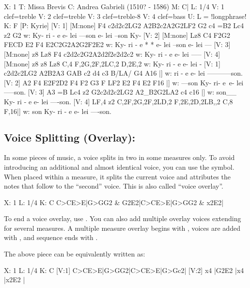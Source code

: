 \documentclass[a4paper,12pt]{book}
\begin{document}
{\small
\begin{abcsource}
X: 1
T: Missa Brevis
C: Andrea Gabrieli (1510? - 1586)
M: C|
L: 1/4
V: 1 clef=treble
V: 2 clef=treble
V: 3 clef=treble-8
V: 4 clef=bass
U: L = !longphrase!
K: F
%
[P: Kyrie]
[V: 1] [M:none] F4 c2d2c2LG2 A2B2c2A2G2LF2 G2 c4 =B2 Lc4 z2 G2
w: Ky- ri - e e- lei ---son e- lei --son Ky-
[V: 2] [M:none] Lz8 C4 F2G2 FECD E2 F4 E2C2G2A2G2F2E2
w: Ky- ri - e * * e- lei --son e- lei ---
[V: 3] [M:none] z8 Lz8 F4 c2d2c2G2A2d2f2e2d2c2
w: Ky- ri - e e- lei -----
[V: 4] [M:none] z8 z8 Lz8 C,4 F,2G,2F,2LC,2 D,2E,2
w: Ky- ri - e e- lei -
%
[V: 1] c2d2c2LG2 A2B2A3 GAB c2 d4 c3 B/LA/ G4 A16      |]
w: ri - e e- lei -----------son.
[V: 2] A2 F4 E2F2D2 F4 F2 G3 F LF2 E2 F4 E2 F16        |]
w: ---son Ky- ri- e~e- lei -----son.
[V: 3] A3 =B Lc4 z2 G2c2d2c2LG2 A2_B2G2LA2 c4 c16      |]
w: son__ Ky- ri - e e- lei ----son.
[V: 4] LF,4 z2 C,2F,2G,2F,2LD,2 F,2E,2D,2LB,,2 C,8 F,16|]
w: son Ky- ri - e e- lei ----son.
\end{abcsource}
}



\subsection{Voice Splitting (Overlay): \icmd{\&}}

In some pieces of music, a voice splits in two in some measures only.
To avoid introducing an additional and almost identical voice, you can
use the \car{\&} symbol. When placed within a measure, it splits the
current voice and attributes the notes that follow to the ``second''
voice. This is also called ``voice overlay''.

\begin{abcsource}
X: 1
L: 1/4
K: C
C>CE>E|G>GG2 & G2E2|C>CE>E|G>GG2 & x2E2|
\end{abcsource}


To end a voice overlay, use \cmd{\&)}. You can also add multiple
overlay voices extending for several measures. A multiple measure
overlay begins with \cmd{(\&)}, voices are added with \car{\&},
and sequence ends with \cmd{\&}.

The above piece can be equivalently written as:

\begin{abcsource}
X: 1
L: 1/4
K: C
[V:1] C>CE>E|G>GG2|C>CE>E|G>Gc2|
[V:2] x4    |G2E2 |x4    |x2E2 |
\end{abcsource}
\end{document}

